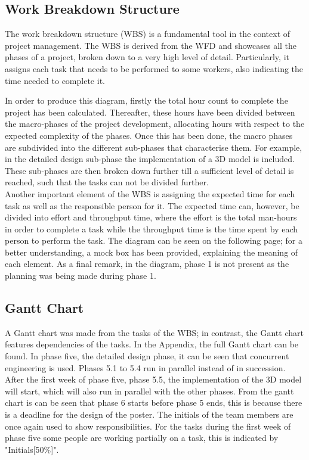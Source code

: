 \subsection{Work Breakdown Structure}
\label{subsec:WorkBreakdownStructure} 
The work breakdown structure (WBS) is a fundamental tool in the context of project management.
The WBS is derived from the WFD and showcases all the phases of a project, broken down to a very high level of detail.
Particularly, it assigns each task that needs to be performed to some workers, also indicating the time needed to complete it. 

In order to produce this diagram, firstly the total hour count to complete the project has been calculated.
Thereafter, these hours have been divided between the macro-phases of the project development, allocating hours with respect to the expected complexity of the phases.
Once this has been done, the macro phases are subdivided into the different sub-phases that characterise them.
For example, in the detailed design sub-phase the implementation of a 3D model is included.
These sub-phases are then broken down further till a sufficient level of detail is reached, such that the tasks can not be divided further. \\
Another important element of the WBS is assigning the expected time for each task as well as the responsible person for it.
The expected time can, however, be divided into effort and throughput time, where the effort is the total man-hours in order to complete a task while the throughput time is the time spent by each person to perform the task.
The diagram can be seen on the following page; for a better understanding, a mock box has been provided, explaining the meaning of each element.
As a final remark, in the diagram, phase 1 is not present as the planning was being made during phase 1.

\subsection{Gantt Chart}
\label{subsec:GanttChart}

A Gantt chart was made from the tasks of the WBS; in contrast, the Gantt chart features dependencies of the tasks.
In the Appendix, the full Gantt chart can be found.
In phase five, the detailed design phase, it can be seen that concurrent engineering is used.
Phases 5.1 to 5.4 run in parallel instead of in succession. After the first week of phase five, phase 5.5, the implementation of the 3D model will start, which will also run in parallel with the other phases.
From the gantt chart is can be seen that phase 6 starts before phase 5 ends, this is because there is a deadline for the design of the poster.
The initials of the team members are once again used to show responsibilities.
For the tasks during the first week of phase five some people are working partially on a task, this is indicated by "Initials[50\%]".


